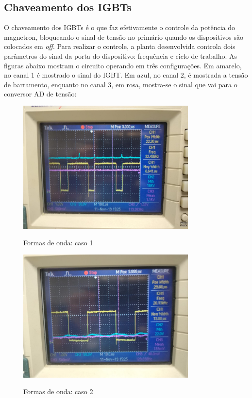 \subsection{Chaveamento dos IGBTs}
O chaveamento dos IGBTs é o que faz efetivamente o controle da potência do magnetron, bloqueando o sinal de tensão no primário quando os dispositivos são colocados em \textit{off}. Para realizar o controle, a planta desenvolvida controla dois parâmetros do sinal da porta do dispositivo: frequência e ciclo de trabalho. As figuras abaixo mostram o circuito operando em três configurações. Em amarelo, no canal 1 é mostrado o sinal do IGBT. Em azul, no canal 2, é mostrada a tensão de barramento, enquanto no canal 3, em rosa, mostra-se o sinal que vai para o conversor AD de tensão:

\begin{figure}[H]
    \centering
    \caption{Formas de onda: caso 1}
    \includegraphics[width=0.8\textwidth]{./dados/figuras/onda_controller_1}
    \label{fig:figura-onda_controller_1}
\end{figure}

\begin{figure}[H]
    \centering
    \caption{Formas de onda: caso 2}
    \includegraphics[width=0.8\textwidth]{./dados/figuras/onda_controller_2}
    \label{fig:figura-onda_controller_2}
\end{figure}

